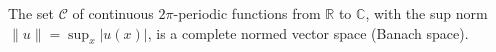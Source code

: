 The set $\mathcal{C}$ of continuous $2\pi$-periodic functions from $\mathbb{R}$ to $\mathbb{C}$, with the sup norm $\|u\| = \sup_x |u(x)|$, is a complete normed vector space (Banach space).
